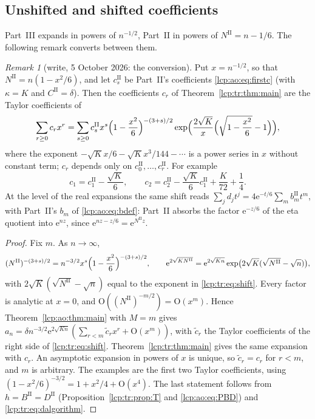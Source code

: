 \documentclass[11pt]{article}
\numberwithin{equation}{section}
\theoremstyle{definition}\newtheorem{definition}[theorem]{Definition}
\theoremstyle{remark}\newtheorem{remark}[theorem]{Remark}
\newcommand{\OO}{\mathrm O}
\newcommand{\ee}{\mathrm e}
\begin{document}
\subsection{Unshifted and shifted coefficients}\label{lcp:tr:sec:shift}
Part~III expands in powers of $n^{-1/2}$, Part~II in powers of
$N^{\mathrm{II}}=n-1/6$. The following remark converts between them.

\begin{remark}[write, 5 October 2026: the conversion]\label{lcp:tr:rem:shift}
Put $x=n^{-1/2}$, so that $N^{\mathrm{II}}=n(1-x^2/6)$, and let $c_s^{\mathrm{II}}$ be
Part~II's coefficients \eqref{lcp:ao:eq:firstc} (with $\kappa=K$ and
$C^{\mathrm{II}}=\delta$). Then the coefficients $c_r$ of
Theorem~\ref{lcp:tr:thm:main} are the Taylor coefficients of
\begin{equation}\label{lcp:tr:eq:shift}
 \sum_{r\ge0}c_rx^r=\sum_{s\ge0}c_s^{\mathrm{II}}x^s
 \Bigl(1-\frac{x^2}6\Bigr)^{-(3+s)/2}
 \exp\Bigl(\frac{2\sqrt K}{x}\Bigl(\sqrt{1-\frac{x^2}6}-1\Bigr)\Bigr),
\end{equation}
where the exponent $-\sqrt Kx/6-\sqrt Kx^3/144-\cdots$ is a power series
in $x$ without constant term; $c_r$ depends only on
$c_0^{\mathrm{II}},\ldots,c_r^{\mathrm{II}}$. For example
\[
 c_1=c_1^{\mathrm{II}}-\frac{\sqrt K}6,\qquad
 c_2=c_2^{\mathrm{II}}-\frac{\sqrt K}6c_1^{\mathrm{II}}+\frac K{72}+\frac14.
\]
At the level of the real expansions the same shift reads
$\sum_jd_jt^j=4\ee^{-t/6}\sum_mb_m^{\mathrm{II}}t^m$, with Part~II's $b_m$
of \eqref{lcp:ao:eq:bdef}: Part~II absorbs the factor $\ee^{-z/6}$ of the eta
quotient into $\ee^{nz}$, since $\ee^{nz-z/6}=\ee^{N^{\mathrm{II}}z}$.
\end{remark}
\begin{proof}
Fix $m$. As $n\to\infty$,
\[
 (N^{\mathrm{II}})^{-(3+s)/2}=n^{-3/2}x^s\Bigl(1-\frac{x^2}6\Bigr)^{-(3+s)/2},\qquad
 \ee^{2\sqrt{KN^{\mathrm{II}}}}=\ee^{2\sqrt{Kn}}
 \exp\bigl(2\sqrt K(\sqrt{N^{\mathrm{II}}}-\sqrt n)\bigr),
\]
with $2\sqrt K(\sqrt{N^{\mathrm{II}}}-\sqrt n)$ equal to the exponent in
\eqref{lcp:tr:eq:shift}. Every factor is analytic at $x=0$, and
$\OO((N^{\mathrm{II}})^{-m/2})=\OO(x^m)$. Hence Theorem~\ref{lcp:ao:thm:main}
with $M=m$ gives $a_n=\delta n^{-3/2}\ee^{2\sqrt{Kn}}(\sum_{r<m}\tilde c_rx^r+\OO(x^m))$,
with $\tilde c_r$ the Taylor coefficients of the right side of
\eqref{lcp:tr:eq:shift}. Theorem~\ref{lcp:tr:thm:main} gives the same
expansion with $c_r$. An asymptotic expansion in powers of $x$ is unique,
so $\tilde c_r=c_r$ for $r<m$, and $m$ is arbitrary. The examples are the
first two Taylor coefficients, using
$(1-x^2/6)^{-3/2}=1+x^2/4+\OO(x^4)$. The last statement follows from
$h=B^{\mathrm{II}}=D^{\mathrm{II}}$ (Proposition~\ref{lcp:tr:prop:T} and
\eqref{lcp:ao:eq:PBD}) and \eqref{lcp:tr:eq:dalgorithm}.
\end{proof}
\end{document}

